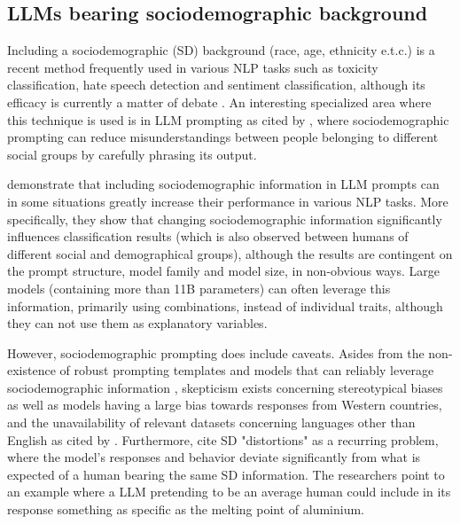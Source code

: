 \subsection{LLMs bearing sociodemographic background}
\label{sec:related:sociodemographic}

Including a sociodemographic (SD) background (race, age, ethnicity e.t.c.) is a recent method frequently used in various NLP tasks such as toxicity classification, hate speech detection and sentiment classification, although its efficacy is currently a matter of debate \cite{beck-etal-2024-sensitivity}. An interesting specialized area where this technique is used is in LLM prompting \cite{hwang-etal-2023-aligning, durmus2024measuringrepresentationsubjectiveglobal} as cited by \cite{beck-etal-2024-sensitivity}, where sociodemographic prompting can reduce misunderstandings between people belonging to different social groups by carefully phrasing its output. 

\cite{beck-etal-2024-sensitivity} demonstrate that including sociodemographic information in LLM prompts can in some situations greatly increase their performance in various NLP tasks. More specifically, they show that changing sociodemographic information significantly influences classification results (which is also observed between humans of different social and demographical groups), although the results are contingent on the prompt structure, model family and model size, in non-obvious ways. Large models (containing more than 11B parameters) can often leverage this information, primarily using combinations, instead of individual traits, although they can not use them as explanatory variables.

However, sociodemographic prompting does include caveats. Asides from the non-existence of robust prompting templates and models that can reliably leverage sociodemographic information \cite{beck-etal-2024-sensitivity}, skepticism exists concerning stereotypical biases \cite{cheng-etal-2023-marked, deshpande-etal-2023-toxicity} as well as models having a large bias towards responses from Western countries, and the unavailability of relevant datasets concerning languages other than English \cite{pmlr-v202-santurkar23a, durmus2024measuringrepresentationsubjectiveglobal, santy-etal-2023-nlpositionality} as cited by \cite{beck-etal-2024-sensitivity}. Furthermore, \cite{aher2023usinglargelanguagemodels} cite SD "distortions" as a recurring problem, where the model's responses and behavior deviate significantly from what is expected of a human bearing the same SD information. The researchers point to an example where a LLM pretending to be an average human could include in its response something as specific as the melting point of aluminium.

